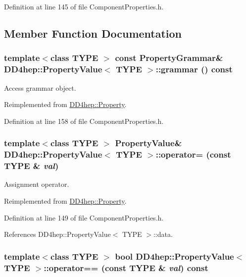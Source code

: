 Definition at line 145 of file ComponentProperties.h.

\subsection{Member Function Documentation}
\hypertarget{class_d_d4hep_1_1_property_value_a38e94952fe4125eb2cd93a3b10a202d6}{
\subsubsection[{grammar}]{\setlength{\rightskip}{0pt plus 5cm}template$<$class TYPE $>$ const {\bf PropertyGrammar}\& {\bf DD4hep::PropertyValue}$<$ TYPE $>$::grammar () const}}
\label{class_d_d4hep_1_1_property_value_a38e94952fe4125eb2cd93a3b10a202d6}


Access grammar object. 

Reimplemented from \hyperlink{class_d_d4hep_1_1_property_ac9688a8f6daf76e38d9cce39e649512b}{DD4hep::Property}.

Definition at line 158 of file ComponentProperties.h.\hypertarget{class_d_d4hep_1_1_property_value_acb9f4997dbe446e56717ba1d58929303}{
\subsubsection[{operator=}]{\setlength{\rightskip}{0pt plus 5cm}template$<$class TYPE $>$ {\bf PropertyValue}\& {\bf DD4hep::PropertyValue}$<$ TYPE $>$::operator= (const TYPE \& {\em val})}}
\label{class_d_d4hep_1_1_property_value_acb9f4997dbe446e56717ba1d58929303}


Assignment operator. 

Reimplemented from \hyperlink{class_d_d4hep_1_1_property_ac47fe600ca62fcd0cfc22ae927d9271c}{DD4hep::Property}.

Definition at line 149 of file ComponentProperties.h.

References DD4hep::PropertyValue$<$ TYPE $>$::data.\hypertarget{class_d_d4hep_1_1_property_value_a57aecd66101f8de649d60bad0ac9791e}{
\subsubsection[{operator==}]{\setlength{\rightskip}{0pt plus 5cm}template$<$class TYPE $>$ bool {\bf DD4hep::PropertyValue}$<$ TYPE $>$::operator== (const TYPE \& {\em val}) const}}
\label{class_d_d4hep_1_1_property_value_a57aecd66101f8de649d60bad0ac9791e}


